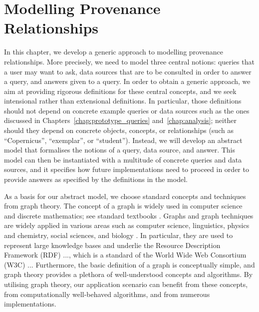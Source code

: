 \chapter{Modelling Provenance Relationships}
\label{chap:modelling}

In this chapter, we develop a generic approach to modelling provenance relationships.
More precisely, we need to model three central notions: queries that a user may want to ask,
data sources that are to be consulted in order to answer a query,
and answers given to a query.
In order to obtain a generic approach, we aim at providing rigorous definitions
for these central concepts, and we seek intensional rather than extensional definitions.
In particular, those definitions should not depend on concrete example queries or data sources
such as the ones discussed in Chapters~\ref{chap:prototype_queries} and~\ref{chap:analysis};
neither should they depend on concrete objects, concepts, or relationships
(such as \enquote{Copernicus}, \enquote{exemplar}, or \enquote{student}).
Instead, we will develop an abstract model that formalises
the notions of a query, data source, and answer.
This model can then be instantiated with a multitude of concrete queries and data sources,
and it specifies how future implementations need to proceed in order to
provide answers as specified by the definitions in the model.

As a basis for our abstract model, we choose standard concepts and techniques
from graph theory.
The concept of a graph is widely used in computer science and discrete mathematics;
see standard textbooks \autocite[e.g.,][]{Diestel2012}.
Graphs and graph techniques are widely applied in various areas such as 
computer science, linguistics, physics and chemistry,
social sciences, and biology \autocite{WikiGraphTheoryApplications}.
In particular, they are used to represent large knowledge bases \autocite[e.g.,][]{Ehrlinger2016}
and underlie the Resource Description Framework (RDF) ..., which is a standard of the
World Wide Web Consortium (W3C) ... 
Furthermore, the basic definition of a graph is conceptually simple,
and graph theory provides a plethora of well-understood concepts
and algorithms. By utilising graph theory, our application scenario
can benefit from these concepts, from computationally well-behaved algorithms,
and from numerous implementations.


